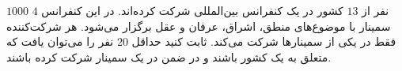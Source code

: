 \EXERCISE
$1000$
نفر از
$13$
کشور در یک کنفرانس بین‌المللی شرکت کرده‌اند. در این کنفرانس
$4$
سمینار با موضوع‌های منطق، اشراق، عرفان و عقل برگزار می‌شود. هر شرکت‌کننده فقط در یکی از سمینارها شرکت می‌کند. ثابت کنید حداقل
$20$
نفر را می‌توان یافت که متعلق به یک کشور باشند و در ضمن در یک سمینار شرکت کرده باشند.